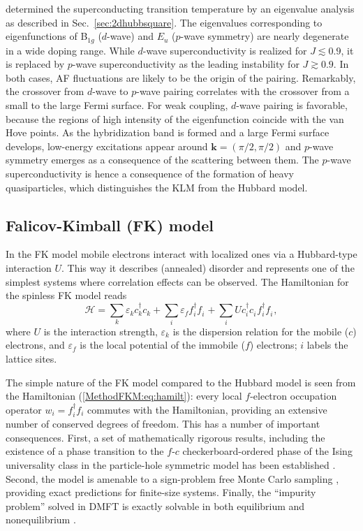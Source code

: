 \documentclass[rmp,aps,reprint,amsmath,amssymb,superscriptaddress,showpacs,nofootinbib]{revtex4-1}
\newcommand{\vc}[1]{\ensuremath{\mathbf{#1}}}
\begin{document}
 determined the superconducting transition temperature by an eigenvalue analysis as described in Sec.~\ref{sec:2dhubbsquare}. The eigenvalues corresponding to eigenfunctions of B$_{1g}$ ($d$-wave) and $E_{u}$ ($p$-wave symmetry) are nearly degenerate in a wide doping range. While $d$-wave superconductivity is realized for $J\lesssim 0.9$, it is replaced by $p$-wave superconductivity as the leading instability for $J\gtrsim 0.9$. In both cases, AF fluctuations are likely to be the origin of the pairing. Remarkably, the crossover from $d$-wave to $p$-wave pairing correlates with the crossover from a small to the large Fermi surface. For weak coupling, $d$-wave pairing is favorable, because the regions of high intensity of the eigenfunction coincide with the van Hove points. As the hybridization band is formed and a large Fermi surface develops, low-energy excitations appear around $\vc{k}=(\pi/2,\pi/2)$ and $p$-wave symmetry emerges as a consequence of the scattering between them. The $p$-wave superconductivity is hence a consequence of the formation of heavy quasiparticles, which distinguishes the KLM from the Hubbard model.

\subsection{Falicov-Kimball (FK) model}
\label{sec:Results_FK}
\label{sec:FKM}

In the FK model  mobile electrons interact with localized ones via a Hubbard-type interaction $U$. This way it describes (annealed) disorder and represents one of the simplest systems where correlation effects can be observed. The Hamiltonian for the spinless FK model reads
\begin{equation}
\label{MethodFKM:eq:hamilt}
  \mathcal{H} = \sum_{k} \varepsilon^{\phantom{\dagger}}_k  c^\dagger_{k} c^{\phantom{\dagger}}_{k}  + \sum_{i} \varepsilon^{\phantom{\dagger}}_f f^\dagger_i f^{\phantom{\dagger}}_i + \sum_{i}U c^\dagger_i c^{\phantom{\dagger}}_i f^\dagger_i f^{\phantom{\dagger}}_i,
\end{equation}
where $U$ is the interaction strength, $\varepsilon_k$ is the dispersion relation for the mobile ($c$) electrons, and $\varepsilon_f$ is the local potential of the immobile ($f$) electrons; $i$ labels the lattice sites.

The simple nature of the FK model compared to the Hubbard model is seen from the Hamiltonian (\ref{MethodFKM:eq:hamilt}): every local $f$-electron occupation operator $w_i = f^\dagger_i f_i$ commutes with the Hamiltonian, providing an extensive number of conserved degrees of freedom. This has a number of important consequences. First, a set of mathematically rigorous results, including the existence of a phase transition to the $f$-$c$ checkerboard-ordered phase of the Ising universality class in the particle-hole symmetric model has been established \cite{Kennedy1986,Brandt1986}. Second, the model is amenable to a sign-problem free Monte Carlo sampling \cite{Maska2005, Maska2006, Zonda2009, Antipov2016}, providing exact predictions for finite-size systems. Finally, the ``impurity problem'' solved in DMFT is exactly solvable in both equilibrium \cite{Brandt1989} and nonequilibrium \cite{Eckstein2008,Eckstein2009}. 
\end{document}
